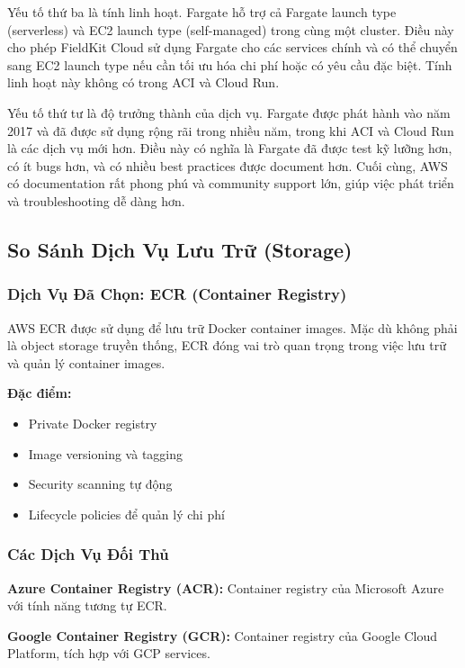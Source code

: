 Yếu tố thứ ba là tính linh hoạt. Fargate hỗ trợ cả Fargate launch type (serverless) và EC2 launch type (self-managed) trong cùng một cluster. Điều này cho phép FieldKit Cloud sử dụng Fargate cho các services chính và có thể chuyển sang EC2 launch type nếu cần tối ưu hóa chi phí hoặc có yêu cầu đặc biệt. Tính linh hoạt này không có trong ACI và Cloud Run.

Yếu tố thứ tư là độ trưởng thành của dịch vụ. Fargate được phát hành vào năm 2017 và đã được sử dụng rộng rãi trong nhiều năm, trong khi ACI và Cloud Run là các dịch vụ mới hơn. Điều này có nghĩa là Fargate đã được test kỹ lưỡng hơn, có ít bugs hơn, và có nhiều best practices được document hơn. Cuối cùng, AWS có documentation rất phong phú và community support lớn, giúp việc phát triển và troubleshooting dễ dàng hơn.

\subsection{So Sánh Dịch Vụ Lưu Trữ (Storage)}

\subsubsection{Dịch Vụ Đã Chọn: ECR (Container Registry)}

AWS ECR được sử dụng để lưu trữ Docker container images. Mặc dù không phải là object storage truyền thống, ECR đóng vai trò quan trọng trong việc lưu trữ và quản lý container images.

\textbf{Đặc điểm:}
\begin{itemize}
    \item Private Docker registry
    \item Image versioning và tagging
    \item Security scanning tự động
    \item Lifecycle policies để quản lý chi phí
\end{itemize}

\subsubsection{Các Dịch Vụ Đối Thủ}

\textbf{Azure Container Registry (ACR):} Container registry của Microsoft Azure với tính năng tương tự ECR.

\textbf{Google Container Registry (GCR):} Container registry của Google Cloud Platform, tích hợp với GCP services.


